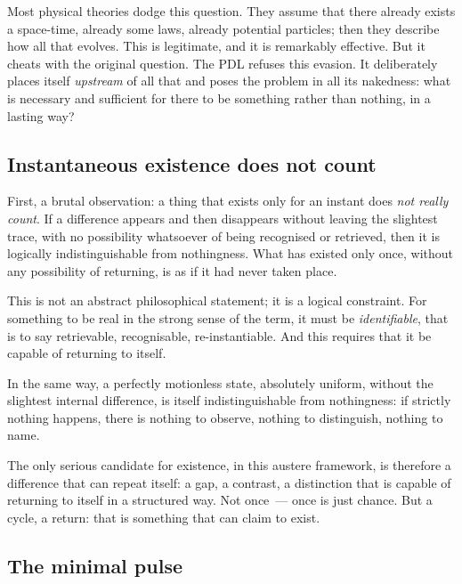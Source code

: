 \documentclass[12pt, a4paper, openright]{book}
\begin{document}
\medskip

Most physical theories dodge this question. They assume that there already exists a space-time, already some laws, already potential particles; then they describe how all that evolves. This is legitimate, and it is remarkably effective. But it cheats with the original question. The PDL refuses this evasion. It deliberately places itself \emph{upstream} of all that and poses the problem in all its nakedness: what is necessary and sufficient for there to be something rather than nothing, in a lasting way?

\subsection*{Instantaneous existence does not count}

First, a brutal observation: a thing that exists only for an instant does \emph{not really count}. If a difference appears and then disappears without leaving the slightest trace, with no possibility whatsoever of being recognised or retrieved, then it is logically indistinguishable from nothingness. What has existed only once, without any possibility of returning, is as if it had never taken place.

\medskip

This is not an abstract philosophical statement; it is a logical constraint. For something to be real in the strong sense of the term, it must be \emph{identifiable}, that is to say retrievable, recognisable, re-instantiable. And this requires that it be capable of returning to itself.

\medskip

In the same way, a perfectly motionless state, absolutely uniform, without the slightest internal difference, is itself indistinguishable from nothingness: if strictly nothing happens, there is nothing to observe, nothing to distinguish, nothing to name.

\medskip

The only serious candidate for existence, in this austere framework, is therefore a difference that can repeat itself: a gap, a contrast, a distinction that is capable of returning to itself in a structured way. Not once~--- once is just chance. But a cycle, a return: that is something that can claim to exist.

\subsection*{The minimal pulse}
\end{document}
